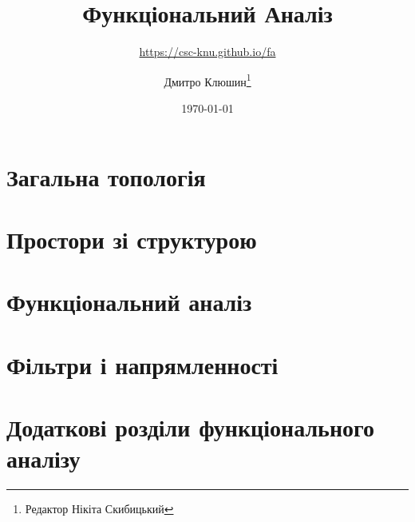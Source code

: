 \documentclass[a4paper,11pt,twoside=semi,openright,numbers=noenddot]{scrbook}
\title{Функціональний Аналіз}
\subtitle{\url{https://csc-knu.github.io/fa}}
\author{Дмитро Клюшин\thanks{Редактор Нікіта Скибицький}}
\date{\today}
\begin{document}
\frontmatter

\maketitle

\thispagestyle{empty}





\tableofcontents

\mainmatter

\part{Загальна топологія}
\parttoc






\part{Простори зі структурою}
\parttoc






\part{Функціональний аналіз}
\parttoc









\part{Фільтри і напрямленності}
\parttoc






\part{Додаткові розділи функціонального аналізу}
\parttoc




\end{document}
